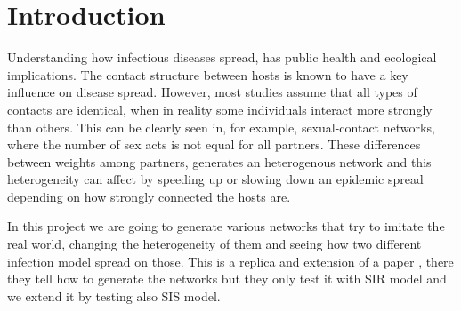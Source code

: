 \section{Introduction}
\label{sec:intro}
Understanding how infectious diseases spread, has public health and ecological implications. The contact structure between hosts is known to have a key influence on disease spread. However, most studies assume that all types of contacts are identical, when in reality some individuals interact more strongly than others. This can be clearly seen in, for example, sexual-contact networks, where the number of sex acts is not equal for all partners. These differences between weights among partners, generates an heterogenous network and this heterogeneity can affect by speeding up or slowing down an epidemic spread depending on how strongly connected the hosts are.

In this project we are going to generate various networks that try to imitate the real world, changing the heterogeneity of them and seeing how two different infection model spread on those. This is a replica and extension of a paper \cite{10.1371/journal.pcbi.1003352}, there they tell how to generate the networks but they only test it with SIR model and we extend it by testing also SIS model.
